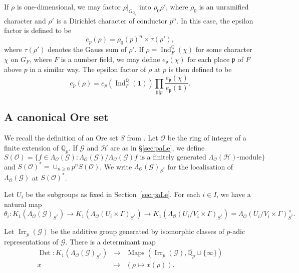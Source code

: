 \documentclass{amsart}
\begin{document}
If $\rho$ is one-dimensional, we may factor $\rho|_{G_{{\mathbb Q}_p}}$ into $\rho_0\rho'$, where $\rho_0$ is an unramified character and $\rho'$ is a Dirichlet character of conductor $p^n$. In this case, the epsilon factor is defined to be
\[
e_p(\rho)=\rho_0(p)^n\times \tau(\rho'),
\]
where $\tau(\rho')$ denotes the Gauss sum of $\rho'$. If $\rho=\operatorname{Ind}_{F}^{\mathbb Q}(\chi)$ for some character $\chi$ on $G_F$, where $F$ is a number field, we may define $e_{\mathfrak{p}}(\chi)$ for each place $\mathfrak{p}$ of $F$ above $p$ in a similar way. The epsilon factor of $\rho$ at $p$ is then defined to be
\[
e_p(\rho)=e_p(\operatorname{Ind}_{F}^{\mathbb Q}(\mathbf{1}))\prod_{\mathfrak{p}|p}\frac{e_{\mathfrak{p}}(\chi)}{e_{\mathfrak{p}}(\mathbf{1})}.
\]

\subsection{A canonical Ore set}\label{sec:ore}

We recall the definition of an Ore set $S$ from \cite{CKFVS}. Let ${\mathcal{O}}$ be the ring of integer of a finite extension of ${{\mathbb Q}_p}$. If ${\mathcal{G}}$ and ${\mathcal{H}}$ are as in \S\ref{sec:paLe}, we define
\[
S({\mathcal{O}})=\{f\in\Lambda_{\mathcal{O}}({\mathcal{G}}):\text{$\Lambda_{\mathcal{O}}({\mathcal{G}})/\Lambda_{\mathcal{O}}({\mathcal{G}})f$ is a finitely generated $\Lambda_{\mathcal{O}}({\mathcal{H}})$-module}\}
\]
and $S({\mathcal{O}})^*=\cup_{n\ge 0}p^nS({\mathcal{O}})$. We write $\Lambda_{\mathcal{O}}({\mathcal{G}})_{S^*}$ for the localisation of $\Lambda_{\mathcal{O}}({\mathcal{G}})$ at $S({\mathcal{O}})^*$.

Let $U_i$ be the subgroups as fixed in Section~\ref{sec:paLe}. For each $i\in I$, we have a natural map
\[
\theta_i:K_1(\Lambda_{\mathcal{O}}({\mathcal{G}})_{S^*})\rightarrow K_1(\Lambda_{\mathcal{O}}(U_i\times\Gamma)_{S^*})\rightarrow K_1(\Lambda_{\mathcal{O}}(U_i/V_i\times\Gamma)_{S^*})=\Lambda_{\mathcal{O}}(U_i/V_i\times\Gamma)_{S^*}^\times.
\]

Let $\operatorname{Irr}_p({\mathcal{G}})$ be the additive group generated by isomorphic classes of $p$-adic representations of ${\mathcal{G}}$. There is a determinant map
\begin{eqnarray*}
\operatorname{Det}:K_1(\Lambda_{\mathcal{O}}({\mathcal{G}})_{S^*})&\rightarrow&\operatorname{Maps}\left(\operatorname{Irr}_p({\mathcal{G}}),\overline{{\mathbb Q}_p}\cup\{\infty\}\right)\\
x&\mapsto&(\rho\mapsto x(\rho)).
\end{eqnarray*}
\end{document}
